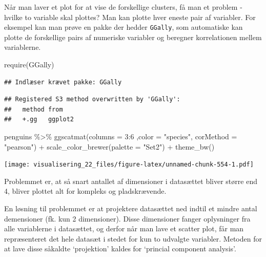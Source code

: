 \documentclass[
]{book}
\newenvironment{Shaded}{\begin{snugshade}}{\end{snugshade}}
\newcommand{\AttributeTok}[1]{\textcolor[rgb]{0.77,0.63,0.00}{#1}}
\newcommand{\DecValTok}[1]{\textcolor[rgb]{0.00,0.00,0.81}{#1}}
\newcommand{\FunctionTok}[1]{\textcolor[rgb]{0.00,0.00,0.00}{#1}}
\newcommand{\NormalTok}[1]{#1}
\newcommand{\SpecialCharTok}[1]{\textcolor[rgb]{0.00,0.00,0.00}{#1}}
\newcommand{\StringTok}[1]{\textcolor[rgb]{0.31,0.60,0.02}{#1}}
\begin{document}
Når man laver et plot for at vise de forskellige clusters, få man et problem - hvilke to variable skal plottes? Man kan plotte hver eneste pair af variabler. For eksempel kan man prøve en pakke der hedder \texttt{GGally}, som automatiske kan plotte de forskellige pairs af numeriske variabler og beregner korrelationen mellem variablerne.

\begin{Shaded}
\begin{Highlighting}[]
\FunctionTok{require}\NormalTok{(GGally)}
\end{Highlighting}
\end{Shaded}

\begin{verbatim}
## Indlæser krævet pakke: GGally
\end{verbatim}

\begin{verbatim}
## Registered S3 method overwritten by 'GGally':
##   method from   
##   +.gg   ggplot2
\end{verbatim}

\begin{Shaded}
\begin{Highlighting}[]
\NormalTok{penguins }\SpecialCharTok{\%\textgreater{}\%} 
  \FunctionTok{ggscatmat}\NormalTok{(}\AttributeTok{columns =} \DecValTok{3}\SpecialCharTok{:}\DecValTok{6}\NormalTok{ ,}\AttributeTok{color =} \StringTok{"species"}\NormalTok{, }\AttributeTok{corMethod =} \StringTok{"pearson"}\NormalTok{) }\SpecialCharTok{+} 
  \FunctionTok{scale\_color\_brewer}\NormalTok{(}\AttributeTok{palette =} \StringTok{"Set2"}\NormalTok{) }\SpecialCharTok{+}
  \FunctionTok{theme\_bw}\NormalTok{()}
\end{Highlighting}
\end{Shaded}

\texttt{[image: visualisering\_22\_files/figure-latex/unnamed-chunk-554-1.pdf]}

Problemmet er, at så snart antallet af dimensioner i datasættet bliver større end 4, bliver plottet alt for kompleks og pladskrævende.

En løsning til problemmet er at projektere datasættet ned indtil et mindre antal demensioner (fk. kun 2 dimensioner). Disse dimensioner fanger oplysninger fra alle variablerne i datasættet, og derfor når man lave et scatter plot, får man repræsenteret det hele datasæt i stedet for kun to udvalgte variabler. Metoden for at lave disse såkaldte `projektion' kaldes for `princial component analysis'.
\end{document}
